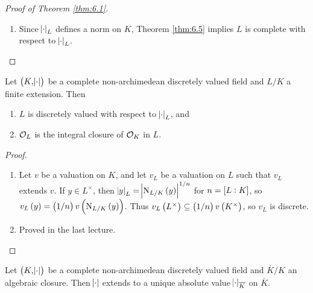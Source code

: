\begin{proof}[Proof of Theorem \ref{thm:6.1}]
\begin{enumerate}
\begin{enumerate}[label=\arabic*.]
\end{enumerate}
To check $ \abs{\cdot}_L $ extends $ \abs{\cdot} $ use $ \N_{L / K}\br{x} = x^n $ for $ x \in K $. If $ \abs{\cdot}_L' $ is another absolute value on $ L $ extending $ \abs{\cdot} $, then note that $ \abs{\cdot}_L $ and $ \abs{\cdot}_L' $ are norms on $ L $. By Theorem \ref{thm:6.5}, $ \abs{\cdot}_L' $ and $ \abs{\cdot}_L $ induce the same topology on $ L $, so $ \abs{\cdot}_L' = \abs{\cdot}_L^c $ for some $ c > 0 $. Since $ \abs{\cdot}_L' $ extends $ \abs{\cdot} $, we have $ c = 1 $.
\item Since $ \abs{\cdot}_L $ defines a norm on $ K $, Theorem \ref{thm:6.5} implies $ L $ is complete with respect to $ \abs{\cdot}_L $.
\end{enumerate}
\end{proof}


\begin{corollary}
Let $ \br{K, \abs{\cdot}} $ be a complete non-archimedean discretely valued field and $ L / K $ a finite extension. Then
\begin{enumerate}
\item $ L $ is discretely valued with respect to $ \abs{\cdot}_L $, and
\item $ \mathcal{O}_L $ is the integral closure of $ \mathcal{O}_K $ in $ L $.
\end{enumerate}
\end{corollary}

\begin{proof}
\hfill
\begin{enumerate}
\item Let $ v $ be a valuation on $ K $, and let $ v_L $ be a valuation on $ L $ such that $ v_L $ extends $ v $. If $ y \in L^\times $, then $ \abs{y}_L = \abs{\N_{L / K}\br{y}}^{1 / n} $ for $ n = \sbr{L : K} $, so $ v_L\br{y} = \br{1 / n}v\br{\N_{L / K}\br{y}} $. Thus $ v_L\br{L^\times} \subseteq \br{1 / n}v\br{K^\times} $, so $ v_L $ is discrete.
\item Proved in the last lecture.
\end{enumerate}
\end{proof}

\begin{corollary}
Let $ \br{K, \abs{\cdot}} $ be a complete non-archimedean discretely valued field and $ \overline{K} / K $ an algebraic closure. Then $ \abs{\cdot} $ extends to a unique absolute value $ \abs{\cdot}_{\overline{K}} $ on $ \overline{K} $.
\end{corollary}

